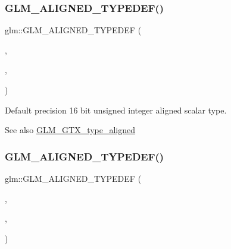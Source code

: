 \subsubsection{\texorpdfstring{G\+L\+M\+\_\+\+A\+L\+I\+G\+N\+E\+D\+\_\+\+T\+Y\+P\+E\+D\+E\+F()}{GLM\_ALIGNED\_TYPEDEF()}\hspace{0.1cm}{\footnotesize\ttfamily [106/209]}}
{\footnotesize\ttfamily glm\+::\+G\+L\+M\+\_\+\+A\+L\+I\+G\+N\+E\+D\+\_\+\+T\+Y\+P\+E\+D\+EF (\begin{DoxyParamCaption}\item[{\hyperlink{group__gtc__type__precision_gad8c2939e1fdd8e5828b31d95c52255d5}{uint16}}]{,  }\item[{aligned\+\_\+uint16}]{,  }\item[{2}]{ }\end{DoxyParamCaption})}

Default precision 16 bit unsigned integer aligned scalar type. \begin{DoxySeeAlso}{See also}
\hyperlink{group__gtx__type__aligned}{G\+L\+M\+\_\+\+G\+T\+X\+\_\+type\+\_\+aligned} 
\end{DoxySeeAlso}
\mbox{\label{group__gtx__type__aligned_gacf1744488c96ebd33c9f36ad33b2010a}} 
\subsubsection{\texorpdfstring{G\+L\+M\+\_\+\+A\+L\+I\+G\+N\+E\+D\+\_\+\+T\+Y\+P\+E\+D\+E\+F()}{GLM\_ALIGNED\_TYPEDEF()}\hspace{0.1cm}{\footnotesize\ttfamily [107/209]}}
{\footnotesize\ttfamily glm\+::\+G\+L\+M\+\_\+\+A\+L\+I\+G\+N\+E\+D\+\_\+\+T\+Y\+P\+E\+D\+EF (\begin{DoxyParamCaption}\item[{\hyperlink{group__gtc__type__precision_ga202b6a53c105fcb7e531f9b443518451}{uint32}}]{,  }\item[{aligned\+\_\+uint32}]{,  }\item[{4}]{ }\end{DoxyParamCaption})}

